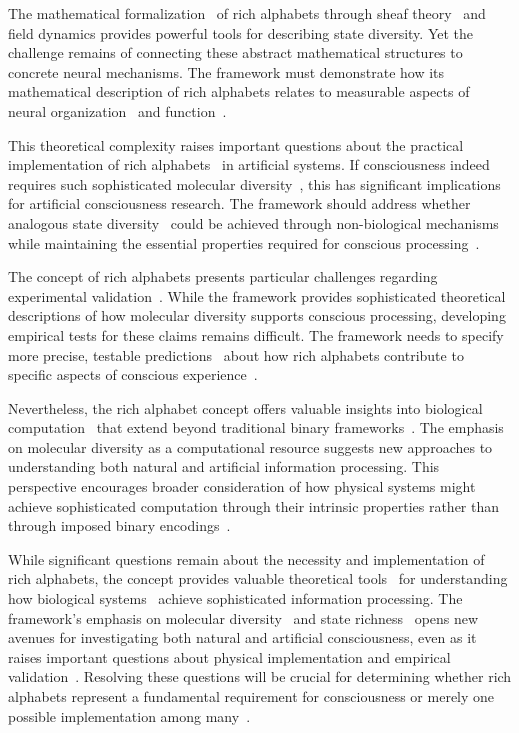 The mathematical formalization~ of rich alphabets through sheaf theory~ and field dynamics provides powerful tools for describing state diversity. Yet the challenge remains of connecting these abstract mathematical structures to concrete neural mechanisms. The framework must demonstrate how its mathematical description of rich alphabets relates to measurable aspects of neural organization~ and function~\cite{varela2016embodied, da2024mathematical}.

This theoretical complexity raises important questions about the practical implementation of rich alphabets~ in artificial systems. If consciousness indeed requires such sophisticated molecular diversity~, this has significant implications for artificial consciousness research. The framework should address whether analogous state diversity~ could be achieved through non-biological mechanisms while maintaining the essential properties required for conscious processing~\cite{koch2019feeling, chalmers2010character}.

The concept of rich alphabets presents particular challenges regarding experimental validation~. While the framework provides sophisticated theoretical descriptions of how molecular diversity supports conscious processing, developing empirical tests for these claims remains difficult. The framework needs to specify more precise, testable predictions~ about how rich alphabets contribute to specific aspects of conscious experience~\cite{seth2021being, thompson2014waking}.

Nevertheless, the rich alphabet concept offers valuable insights into biological computation~ that extend beyond traditional binary frameworks~. The emphasis on molecular diversity as a computational resource suggests new approaches to understanding both natural and artificial information processing. This perspective encourages broader consideration of how physical systems might achieve sophisticated computation through their intrinsic properties rather than through imposed binary encodings~\cite{kauffman2019world, rosen2012anticipatory}.

While significant questions remain about the necessity and implementation of rich alphabets, the concept provides valuable theoretical tools~ for understanding how biological systems~ achieve sophisticated information processing. The framework's emphasis on molecular diversity~ and state richness~ opens new avenues for investigating both natural and artificial consciousness, even as it raises important questions about physical implementation and empirical validation~. Resolving these questions will be crucial for determining whether rich alphabets represent a fundamental requirement for consciousness or merely one possible implementation among many~\cite{chalmers2010character, koch2019feeling}.

